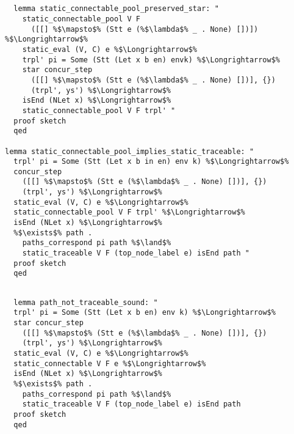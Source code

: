 \documentclass{article}
\begin{document}
\begin{lstlisting}[style=codestyle1, escapechar=\%]


  lemma static_connectable_pool_preserved_star: "
    static_connectable_pool V F
      ([[] %$\mapsto$% (Stt e (%$\lambda$% _ . None) [])]) %$\Longrightarrow$%
    static_eval (V, C) e %$\Longrightarrow$%
    trpl' pi = Some (Stt (Let x b en) envk) %$\Longrightarrow$%
    star concur_step
      ([[] %$\mapsto$% (Stt e (%$\lambda$% _ . None) [])], {})
      (trpl', ys') %$\Longrightarrow$%
    isEnd (NLet x) %$\Longrightarrow$%
    static_connectable_pool V F trpl' "
  proof sketch
  qed

lemma static_connectable_pool_implies_static_traceable: "
  trpl' pi = Some (Stt (Let x b in en) env k) %$\Longrightarrow$%
  concur_step
    ([[] %$\mapsto$% (Stt e (%$\lambda$% _ . None) [])], {})
    (trpl', ys') %$\Longrightarrow$% 
  static_eval (V, C) e %$\Longrightarrow$%
  static_connectable_pool V F trpl' %$\Longrightarrow$%
  isEnd (NLet x) %$\Longrightarrow$%
  %$\exists$% path . 
    paths_correspond pi path %$\land$%
    static_traceable V F (top_node_label e) isEnd path "
  proof sketch
  qed
  \end{lstlisting}


\begin{lstlisting}[style=codestyle1, escapechar=\%]

  lemma path_not_traceable_sound: "
  trpl' pi = Some (Stt (Let x b en) env k) %$\Longrightarrow$%
  star concur_step
    ([[] %$\mapsto$% (Stt e (%$\lambda$% _ . None) [])], {})
    (trpl', ys') %$\Longrightarrow$% 
  static_eval (V, C) e %$\Longrightarrow$%
  static_connectable V F e %$\Longrightarrow$%
  isEnd (NLet x) %$\Longrightarrow$%
  %$\exists$% path . 
    paths_correspond pi path %$\land$%
    static_traceable V F (top_node_label e) isEnd path
  proof sketch
  qed
  \end{lstlisting}
\end{document}
